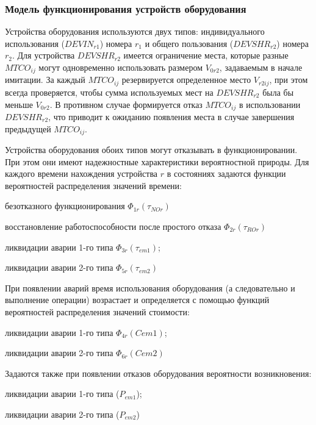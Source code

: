 \subsubsection{Модель функционирования устройств оборудования}

Устройства оборудования используются двух типов: индивидуального использования ($DEVIN_{r1}$) номера $r_1$  и общего пользования ($DEVSHR_{r2}$)  номера  $r_2$.  Для устройства $DEVSHR_{r2}$ имеется ограничение места, которые разные  $MTCO_{ij}$ могут одновременно использовать размером $V_{0r2}$, задаваемым в начале имитации. За каждый $MTCO_{ij}$ резервируется определенное место $V_{r2ij}$, при этом всегда проверяется, чтобы сумма используемых мест  на $DEVSHR_{r2}$ была бы меньше $V_{0r2}$. В противном случае формируется отказ $MTCO_{ij}$ в использовании $DEVSHR_{r2}$, что приводит к ожиданию появления места в случае завершения предыдущей $MTCO_{ij}$.

Устройства оборудования обоих типов могут отказывать в функционировании. При этом они имеют надежностные характеристики вероятностной природы. Для каждого времени нахождения устройства $r$  в состояниях задаются функции вероятностей распределения значений времени:
\begin{textitemize}
    \item безотказного функционирования $\Phi_{1r}(\tau_{NOr})$
    \item восстановление работоспособности после простого отказа $\Phi_{2r}(\tau_{ROr})$
    \item ликвидации аварии 1-го типа $\Phi_{3r}(\tau_{em1})$;
    \item ликвидации аварии 2-го типа $\Phi_{5r}(\tau_{em2})$

\end{textitemize}

При появлении аварий время  использования оборудования (а следовательно и выполнение операции) возрастает и определяется с помощью функций вероятностей распределения значений стоимости:
\begin{textitemize}
    \item ликвидации аварии 1-го типа $\Phi_{4r}(C{em1})$;
    \item ликвидации аварии 2-го типа $\Phi_{6r}(C{em2})$
\end{textitemize}

Задаются также при появлении отказов оборудования  вероятности возникновения:
\begin{textitemize}
    \item ликвидации аварии 1-го типа ($P_{em1}$);
    \item ликвидации аварии 2-го типа ($P_{em2}$)
\end{textitemize}

